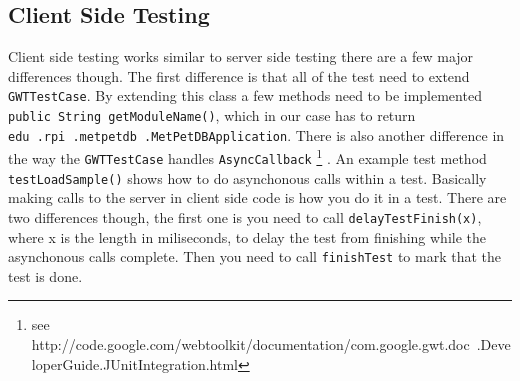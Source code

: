 \documentclass[10pt,letterpaper,onecolumn,oneside]{report}
\begin{document}
\subsection{Client Side Testing}
Client side testing works similar to server side testing there are a few major differences though.  The first difference is that all of the test need to extend \texttt{GWTTestCase}. By extending this class a few methods need to be implemented \texttt{public String getModuleName()}, which in our case
has to return \texttt{edu\ .rpi\ .metpetdb\ .MetPetDBApplication}.  There is also another difference in the way the \texttt{GWTTestCase} handles 
\texttt{AsyncCallback}
\footnote{see http://code.google.com/webtoolkit/documentation/com.google.gwt.doc\ .DeveloperGuide.JUnitIntegration.html}
. An example test method \texttt{testLoadSample()} shows how to do asynchonous calls
within a test.  Basically making calls to the server in client side code
is how you do it in a test.  There are two differences though, the first one
is you need to call \texttt{delayTestFinish(x)}, where x is the length
in miliseconds, to delay the test from finishing while the asynchonous
calls complete.  Then you need to call \texttt{finishTest} to mark
that the test is done.
\end{document}
